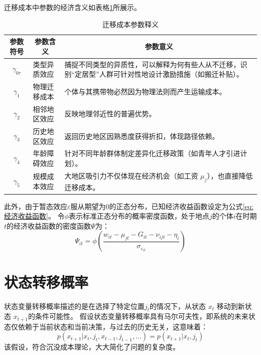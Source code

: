 \documentclass[a4paper,12pt,oneside]{book} %
\begin{document}
迁移成本中参数的经济含义如表格\ref{tab:迁移成本参数释义}所展示。
\begin{table}[!ht]
  \centering
  \begin{tabularx}{\textwidth}{@{}llX@{}}
    \toprule
    \multicolumn{1}{c}{\textbf{参数符号}} & \multicolumn{1}{c}{\textbf{参数含义}} & \multicolumn{1}{c}{\textbf{参数意义}} \\ \midrule
    \multicolumn{1}{c}{$\gamma_{0\tau}$} & 类型异质效应 & 捕捉不同类型的异质性，可以解释为何有些人从不迁移，识别“定居型”人群可针对性地设计激励措施（如搬迁补贴）。\\ 
    \multicolumn{1}{c}{$\gamma_1$} & 物理迁移成本 & 个体与其携带物必然因为物理法则而产生运输成本。 \\ 
    \multicolumn{1}{c}{$\gamma_2$} & 相邻地区效应 & 反映地理邻近性的普遍优势。 \\ 
    \multicolumn{1}{c}{$\gamma_3$} & 历史地区效应 & 返回历史地区因熟悉度获得折扣，体现路径依赖。 \\ 
    \multicolumn{1}{c}{$\gamma_4$} & 年龄障碍效应 & 针对不同年龄群体制定差异化迁移政策（如青年人才引进计划）。\\ 
    \multicolumn{1}{c}{$\gamma_5$} & 规模成本效应 & 大地区吸引力不仅体现在经济机会（如工资 $\mu_j$），也直接降低迁移成本。\\ \bottomrule
  \end{tabularx}
  \caption{迁移成本参数释义}
  \label{tab:迁移成本参数释义}
\end{table}


此外，由于暂态效应$\varepsilon$服从期望为0的正态分布，已知经济收益函数设定为公式\ref{eq:经济收益函数}。
令$\phi$表示标准正态分布的概率密度函数，处于地点$j$的个体$i$在时期$t$的经济收益函数的密度函数$\Psi$为：
\begin{equation}
  \Psi_{it}=\phi(\frac{w_{it} - \mu_{jt} - G_{it} - \nu_{ijt} - \eta_i }{\sigma_{\varepsilon_{it}}})
  \label{eq:经济收益似然贡献}
\end{equation}


\section{状态转移概率}

状态变量转移概率描述的是在选择了特定位置$j_{t}$的情况下，从状态 $x_t$ 移动到新状态 $x_{t+1}$的条件可能性。
假设状态变量转移概率具有马尔可夫性，即系统的未来状态仅依赖于当前状态和当前决策，与过去的历史无关，这意味着：
\begin{equation}
  p(x_{t+1}|x_{t},j_{t},x_{t-1},j_{t-1},\ldots)=p(x_{t+1}|x_{t},j_{t})
\end{equation}
该假设，符合沉没成本理论，大大简化了问题的复杂度。
\end{document}
